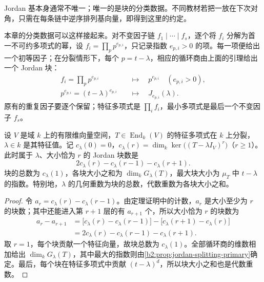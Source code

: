 Jordan 基本身通常不唯一；唯一的是块的分类数据。不同教材若把一放在下次对角，只需在每条链中逆序排列基向量，即得到这里的约定。

本章的分类数据可以这样接起来。对不变因子链 \(f_1\mid\cdots\mid f_s\)，逐个将 \(f_i\) 分解为首一不可约多项式的幂，设 \(f_i=\prod_p p^{e_{p,i}}\)，只记录指数 \(e_{p,i}>0\) 的项。每一项便给出一个初等因子；在分裂情形下，每个 \(p=t-\lambda\)，相应的循环商由上面的引理给出一个 Jordan 块：
\[
	\begin{aligned}
		f_i=\prod_p p^{e_{p,i}} &\quad\longmapsto\quad p^{e_{p,i}}\quad(e_{p,i}>0),\\
		p^{e_{p,i}}=(t-\lambda)^{e_{p,i}} &\quad\longmapsto\quad J_{e_{p,i}}(\lambda).
	\end{aligned}
\]
原有的重复因子要逐个保留；特征多项式是 \(\prod_i f_i\)，最小多项式是最后一个不变因子 \(f_s\)。

\begin{proposition}\label{b2:prop:jordan-kernel-dimensions}
	设 \(V\) 是域 \(k\) 上的有限维向量空间，\(T\in\operatorname{End}_k(V)\) 的特征多项式在 \(k\) 上分裂，\(\lambda\in k\) 是其特征值。记 \(c_\lambda(0)=0\)，\(c_\lambda(r)=\dim_k\ker\bigl((T-\lambda I_V)^r\bigr)\)（\(r\ge1\)）。此时属于 \(\lambda\)、大小恰为 \(r\) 的 Jordan 块数是
	\[
		2c_\lambda(r)-c_\lambda(r-1)-c_\lambda(r+1).
	\]
	块的总数为 \(c_\lambda(1)\)，各块大小之和为 \(\dim_k G_\lambda(T)\)，最大块大小为 \(\mu_T\) 中 \(t-\lambda\) 的指数。特别地，\(\lambda\) 的几何重数为块的总数，代数重数为各块大小之和。
\end{proposition}
\begin{proof}
	令 \(a_r=c_\lambda(r)-c_\lambda(r-1)\)。由定理证明中的计数，\(a_r\) 是大小至少为 \(r\) 的块数；其中还能进入第 \(r+1\) 层的有 \(a_{r+1}\) 个，所以大小恰为 \(r\) 的块数为
	\[
		\begin{aligned}
			a_r-a_{r+1} &=\bigl[c_\lambda(r)-c_\lambda(r-1)\bigr] -\bigl[c_\lambda(r+1)-c_\lambda(r)\bigr]\\
			&=2c_\lambda(r)-c_\lambda(r-1)-c_\lambda(r+1).
		\end{aligned}
	\]
	取 \(r=1\)，每个块贡献一个特征向量，故块总数为 \(c_\lambda(1)\)。全部循环商的维数相加给出 \(\dim_k G_\lambda(T)\)，其中最大的指数则由\cref{b2:prop:jordan-splitting-primary}确定。最后，每个块在特征多项式中贡献 \((t-\lambda)^d\)，所以块大小之和也是代数重数。
\end{proof}

